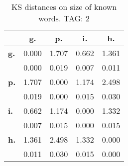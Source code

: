 \begin{table}[h!]
\begin{center}
\begin{tabular}{| l || c | c | c | c |}\hline
 & {\bf g.} & {\bf p.} & {\bf i.} & {\bf h.} \\\hline\hline
{\bf g.} & 0.000 & 1.707 & 0.662 & 1.361 \\
{\bf } & 0.000 & 0.019 & 0.007 & 0.011 \\\hline
{\bf p.} & 1.707 & 0.000 & 1.174 & 2.498 \\
{\bf } & 0.019 & 0.000 & 0.015 & 0.030 \\\hline
{\bf i.} & 0.662 & 1.174 & 0.000 & 1.332 \\
{\bf } & 0.007 & 0.015 & 0.000 & 0.015 \\\hline
{\bf h.} & 1.361 & 2.498 & 1.332 & 0.000 \\
{\bf } & 0.011 & 0.030 & 0.015 & 0.000 \\\hline
\end{tabular}
\caption{KS distances on size of known words. TAG: 2}
\end{center}
\end{table}
